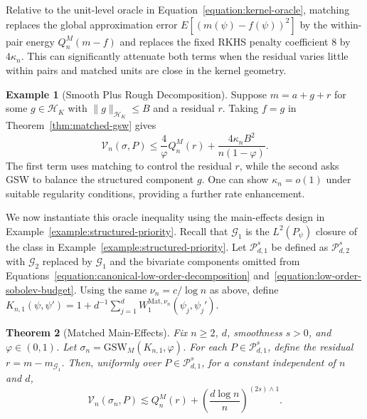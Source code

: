 \documentclass[letterpaper,12pt]{article}
\newtheorem{thm}{Theorem}[section]
\theoremstyle{definition}
\newtheorem{ex}[thm]{Example}
\numberwithin{equation}{section}
\newcommand{\mc}{\mathcal}
\newcommand{\norm}[1]{\lVert#1\rVert}
\begin{document}
Relative to the unit-level oracle in Equation~\eqref{equation:kernel-oracle}, matching replaces the global approximation error $E[(m(\psi)-f(\psi))^2]$ by the within-pair energy $Q_n^M(m-f)$ and replaces the fixed RKHS penalty coefficient $8$ by $4\kappa_n$.
This can significantly attenuate both terms when the residual varies little within pairs and matched units are close in the kernel geometry.

\begin{ex}[Smooth Plus Rough Decomposition]
Suppose $m=a+g+r$ for some $g\in\mc H_K$ with $\norm{g}_{\mc H_K}\leq B$ and a residual $r$.
Taking $f=g$ in Theorem~\ref{thm:matched-gsw} gives
\begin{equation}\label{equation:matched-smooth-rough-specialization}
\mc V_n(\sigma,P)\leq\frac4\varphi Q_n^M(r)+\frac{4\kappa_nB^2}{n(1-\varphi)}.
\end{equation}
The first term uses matching to control the residual $r$, while the second asks GSW to balance the structured component $g$.
One can show $\kappa_n=o(1)$ under suitable regularity conditions, providing a further rate enhancement.
\end{ex}

We now instantiate this oracle inequality using the main-effects design in Example~\ref{example:structured-priority}.
Recall that $\mc G_1$ is the $L^2(P_\psi)$ closure of the class in Example~\ref{example:structured-priority}.
Let $\mc P_{d,1}^{s}$ be defined as $\mc P_{d,2}^{s}$ with $\mc G_2$ replaced by $\mc G_1$ and the bivariate components omitted from Equations~\eqref{equation:canonical-low-order-decomposition} and~\eqref{equation:low-order-sobolev-budget}.
Using the same $\nu_n=c/\log n$ as above, define $K_{n,1}(\psi,\psi')=1+d^{-1}\sum_{j=1}^dW_1^{\mathrm{Mat},\nu_n}(\psi_j,\psi_j')$.

\begin{thm}[Matched Main-Effects]\label{theorem:matched-low-order-gsw}
Fix $n\geq2$, $d$, smoothness $s>0$, and $\varphi\in(0,1)$.
Let $\sigma_n=\mathrm{GSW}_M(K_{n,1},\varphi)$.
For each $P\in\mc P_{d,1}^{s}$, define the residual $r=m-m_{\mc G_1}$.
Then, uniformly over $P\in\mc P_{d,1}^{s}$, for a constant independent of $n$ and $d$,
\begin{equation}\label{equation:matched-low-order-gsw}
\mc V_n(\sigma_n,P)\lesssim Q_n^M(r)+\left(\frac{d\log n}{n}\right)^{(2s)\wedge1}.
\end{equation}
\end{thm}
\end{document}
